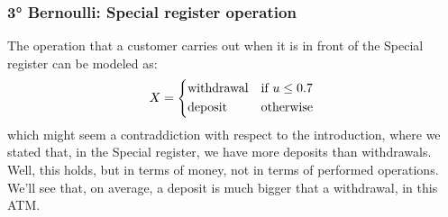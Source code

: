 \documentclass{article}
\begin{document}
\subsubsection{3° Bernoulli: Special register operation}
The operation that a customer carries out when it is in front of the Special register can be modeled as:
 \begin{equation*}
    X =
    \begin{cases*}
      \text{withdrawal} & if $u \leq 0.7$ \\
      \text{deposit}        & otherwise
    \end{cases*}
  \end{equation*}
which might seem a contraddiction with respect to the introduction, where we stated that, in the Special register, we have more deposits than withdrawals. Well, this holds, but in terms of money, not in terms of performed operations. We'll see that, on average, a deposit is much bigger that a withdrawal, in this ATM.
\end{document}
